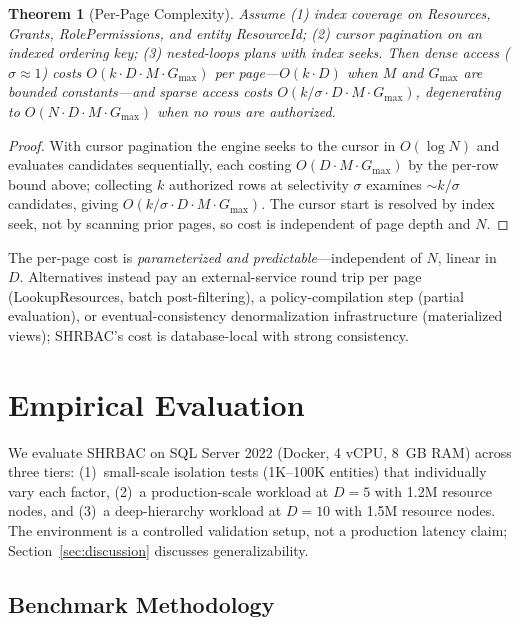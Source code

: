\documentclass[conference]{IEEEtran}
\newtheorem{theorem}{Theorem}
\begin{document}
\begin{theorem}[Per-Page Complexity]
\label{thm:perpage}
Assume (1) index coverage on Resources, Grants, RolePermissions, and entity ResourceId; (2) cursor pagination on an indexed ordering key; (3) nested-loops plans with index seeks. Then dense access ($\sigma \approx 1$) costs $O(k \cdot D \cdot M \cdot G_{\max})$ per page---$O(k \cdot D)$ when $M$ and $G_{\max}$ are bounded constants---and sparse access costs $O(k/\sigma \cdot D \cdot M \cdot G_{\max})$, degenerating to $O(N \cdot D \cdot M \cdot G_{\max})$ when no rows are authorized.
\end{theorem}
\begin{proof}
With cursor pagination the engine seeks to the cursor in $O(\log N)$ and evaluates candidates sequentially, each costing $O(D \cdot M \cdot G_{\max})$ by the per-row bound above; collecting $k$ authorized rows at selectivity $\sigma$ examines ${\sim}k/\sigma$ candidates, giving $O(k/\sigma \cdot D \cdot M \cdot G_{\max})$. The cursor start is resolved by index seek, not by scanning prior pages, so cost is independent of page depth and $N$.
\end{proof}

The per-page cost is \emph{parameterized and predictable}---independent of $N$, linear in $D$. Alternatives instead pay an external-service round trip per page (LookupResources, batch post-filtering), a policy-compilation step (partial evaluation), or eventual-consistency denormalization infrastructure (materialized views); SHRBAC's cost is database-local with strong consistency.

\section{Empirical Evaluation}
\label{sec:empirical}

We evaluate SHRBAC on SQL Server 2022 (Docker, 4 vCPU, 8~GB RAM) across three tiers: (1)~small-scale isolation tests (1K--100K entities) that individually vary each factor, (2)~a production-scale workload at $D{=}5$ with 1.2M resource nodes, and (3)~a deep-hierarchy workload at $D{=}10$ with 1.5M resource nodes. The environment is a controlled validation setup, not a production latency claim; Section~\ref{sec:discussion} discusses generalizability.

\subsection{Benchmark Methodology}
\end{document}
